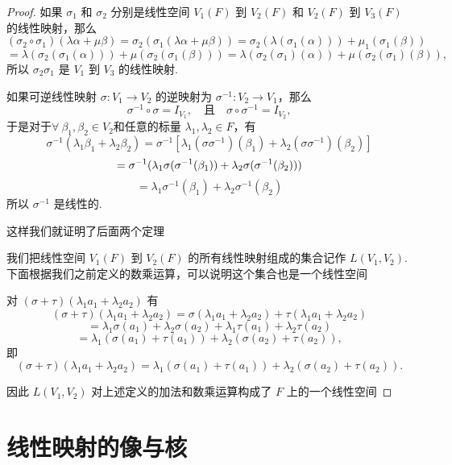 \begin{proof}

如果 $\sigma_1$ 和 $\sigma_2$ 分别是线性空间 $V_1(F)$ 到 $V_2(F)$ 和 $V_2(F)$ 到 $V_3(F)$ 的线性映射，那么
\[
(\sigma_2 \circ \sigma_1)(\lambda \alpha  + \mu \beta) = \sigma_2(\sigma_1(\lambda \alpha  + \mu \beta)) = \sigma_2(\lambda (\sigma_1(\alpha))) + \mu_1(\sigma_1(\beta))
\]
\[
= \lambda (\sigma_2(\sigma_1(\alpha))) + \mu (\sigma_2(\sigma_1(\beta))) = \lambda(\sigma_2(\sigma_1)(\alpha)) + \mu (\sigma_2(\sigma_1)(\beta)),
\]
所以 $\sigma_2\sigma_1$ 是 $V_1$ 到 $V_3$ 的线性映射.

如果可逆线性映射 $\sigma: V_1 \to V_2$ 的逆映射为 $\sigma^{-1}: V_2 \to V_1$，那么
\[
\sigma^{-1} \circ \sigma = I_{V_1}, \quad \text{且} \quad \sigma \circ \sigma^{-1} = I_{V_2},
\]
于是对于$ \forall \ \beta_1,\beta_2 \in V_2$和任意的标量 $\lambda_1, \lambda_2 \in F$，有
\[
\sigma^{-1}(\lambda_1 \beta_1 + \lambda_2 \beta_2) =
\sigma^{-1}\left[ \lambda_1(\sigma \sigma^{-1})(\beta_1)+\lambda_2(\sigma \sigma^{-1})(\beta_2)\right]
\]
\[
= \sigma^{-1}(\lambda_1 \sigma(\sigma^{-1}(\beta_1)) + \lambda_2 \sigma(\sigma^{-1}(\beta_2)))\\
\]
\[
= \lambda_1 \sigma^{-1}(\beta_1) + \lambda_2 \sigma^{-1}(\beta_2)
\]
所以 $\sigma^{-1}$ 是线性的.

这样我们就证明了后面两个定理

我们把线性空间 $V_1(F)$ 到 $V_2(F)$ 的所有线性映射组成的集合记作 $L(V_1,V_2)$.下面根据我们之前定义的数乘运算，可以说明这个集合也是一个线性空间

对 $(\sigma + \tau)(\lambda_1 a_1 + \lambda_2 a_2)$ 有
\[
(\sigma + \tau)(\lambda_1 a_1 + \lambda_2 a_2) = \sigma(\lambda_1 a_1 + \lambda_2 a_2) + \tau(\lambda_1 a_1 + \lambda_2 a_2)
\]
\[
= \lambda_1 \sigma(a_1) + \lambda_2 \sigma(a_2) + \lambda_1 \tau(a_1) + \lambda_2 \tau(a_2)
\]
\[
= \lambda_1 (\sigma(a_1) + \tau(a_1)) + \lambda_2 (\sigma(a_2) + \tau(a_2)),
\]
即
\[
(\sigma + \tau)(\lambda_1 a_1 + \lambda_2 a_2) = \lambda_1(\sigma(a_1) + \tau(a_1)) + \lambda_2(\sigma(a_2) + \tau(a_2)).
\]

因此 $L (V_1,V_2)$ 对上述定义的加法和数乘运算构成了 $F$ 上的一个线性空间
\end{proof}

\section{线性映射的像与核}

